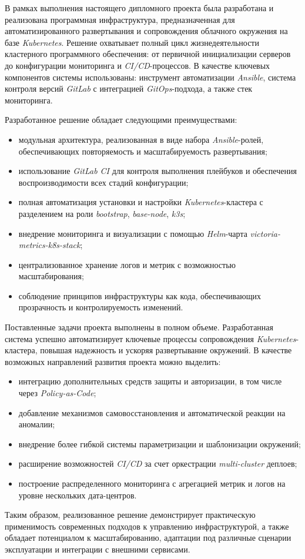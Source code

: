 \label{sec:outro}

В рамках выполнения настоящего дипломного проекта была разработана и реализована программная инфраструктура, предназначенная для автоматизированного развертывания и сопровождения облачного окружения на базе \textit{Kubernetes}. Решение охватывает полный цикл жизнедеятельности кластерного программного обеспечения: от первичной инициализации серверов до конфигурации мониторинга и \textit{CI/CD}-процессов. В качестве ключевых компонентов системы использованы: инструмент автоматизации \textit{Ansible}, система контроля версий \textit{GitLab} с интеграцией \textit{GitOps}-подхода, а также стек мониторинга.

Разработанное решение обладает следующими преимуществами:
\begin{itemize}
    \item модульная архитектура, реализованная в виде набора \textit{Ansible}-ролей, обеспечивающих повторяемость и масштабируемость развертывания;
    \item использование \textit{GitLab CI} для контроля выполнения плейбуков и обеспечения воспроизводимости всех стадий конфигурации;
    \item полная автоматизация установки и настройки \textit{Kubernetes}-кластера с разделением на роли \textit{bootstrap}, \textit{base-node}, \textit{k3s};
    \item внедрение мониторинга и визуализации с помощью \textit{Helm}-чарта \textit{victoria-metrics-k8s-stack};
    \item централизованное хранение логов и метрик с возможностью масштабирования;
    \item соблюдение принципов инфраструктуры как кода, обеспечивающих прозрачность и контролируемость изменений.
\end{itemize}

Поставленные задачи проекта выполнены в полном объеме. Разработанная система успешно автоматизирует ключевые процессы сопровождения \textit{Kubernetes}-кластера, повышая надежность и ускоряя развертывание окружений. В качестве возможных направлений развития проекта можно выделить:
\begin{itemize}
    \item интеграцию дополнительных средств защиты и авторизации, в том числе через \textit{Policy-as-Code};
    \item добавление механизмов самовосстановления и автоматической реакции на аномалии;
    \item внедрение более гибкой системы параметризации и шаблонизации окружений;
    \item расширение возможностей \textit{CI/CD} за счет оркестрации \textit{multi-cluster} деплоев;
    \item построение распределенного мониторинга с агрегацией метрик и логов на уровне нескольких дата-центров.
\end{itemize}

Таким образом, реализованное решение демонстрирует практическую применимость современных подходов к управлению инфраструктурой, а также обладает потенциалом к масштабированию, адаптации под различные сценарии эксплуатации и интеграции с внешними сервисами.
